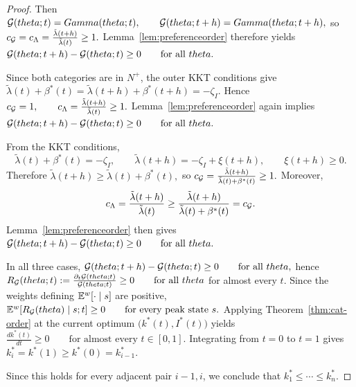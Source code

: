\documentclass{class}
\begin{document}
\begin{proof}
\smallskip
{}
Then
$\mathcal{G}(theta;t)=Gamma(theta;t), \qquad \mathcal{G}(theta;t+h)=Gamma(theta;t+h),$
so
$c_{\mathcal{G}}=c_\Lambda=\frac{\tilde\lambda(t+h)}{\tilde\lambda(t)}\ge 1.$
Lemma~\ref{lem:preferenceorder} therefore yields
$\mathcal{G}(theta;t+h)-\mathcal{G}(theta;t)\ge 0 \qquad \text{for all }theta.$

\smallskip
{}
Since both categories are in \(N^+\), the outer KKT conditions give
$\tilde\lambda(t)+\beta^\ast(t) = \tilde\lambda(t+h)+\beta^\ast(t+h) = -\zeta_I.$
Hence
$c_{\mathcal{G}}=1, \qquad c_\Lambda=\frac{\tilde\lambda(t+h)}{\tilde\lambda(t)}\ge 1.$
Lemma~\ref{lem:preferenceorder} again implies
$\mathcal{G}(theta;t+h)-\mathcal{G}(theta;t)\ge 0 \qquad \text{for all }theta.$

\smallskip
{}
From the KKT conditions,
\[
\tilde\lambda(t)+\beta^\ast(t)=-\zeta_I,
\qquad
\tilde\lambda(t+h)=-\zeta_I+\xi(t+h),
\qquad
\xi(t+h)\ge 0.
\]
Therefore
$\tilde\lambda(t+h)\ge \tilde\lambda(t)+\beta^\ast(t),$
so
$c_{\mathcal{G}} = \frac{\tilde\lambda(t+h)}{\tilde\lambda(t)+\beta^\ast(t)} \ge 1.$
Moreover,
\[
c_\Lambda
=
\frac{\tilde\lambda(t+h)}{\tilde\lambda(t)}
\ge
\frac{\tilde\lambda(t+h)}{\tilde\lambda(t)+\beta^\ast(t)}
=
c_{\mathcal{G}}.
\]
Lemma~\ref{lem:preferenceorder} then gives
$\mathcal{G}(theta;t+h)-\mathcal{G}(theta;t)\ge 0 \qquad \text{for all }theta.$

\smallskip
In all three cases,
$\mathcal{G}(theta;t+h)-\mathcal{G}(theta;t)\ge 0 \qquad \text{for all }theta,$
hence
$R_{\mathcal{G}}(theta;t):= \frac{\partial_t\mathcal{G}(theta;t)}{\mathcal{G}(theta;t)} \ge 0 \qquad \text{for all }theta$
for almost every \(t\). Since the weights defining \(\mathbb{E}^w[\cdot\mid s]\) are positive,
$\mathbb{E}^w\!\left[R_{\mathcal{G}}(theta)\mid s;t\right]\ge 0 \qquad \text{for every peak state } s.$
Applying Theorem~\ref{thm:cat-order} at the current optimum
$\bigl(k^\ast(t),I^\ast(t)\bigr)$
yields
$\frac{d k^\ast(t)}{dt}\ge 0 \qquad \text{for almost every } t\in[0,1].$
Integrating from \(t=0\) to \(t=1\) gives
$k_i^\ast=k^\ast(1)\ge k^\ast(0)=k_{i-1}^\ast.$

Since this holds for every adjacent pair \(i-1,i\), we conclude that
$k_1^\ast\le \cdots \le k_n^\ast.$
\end{proof}


\end{document}

